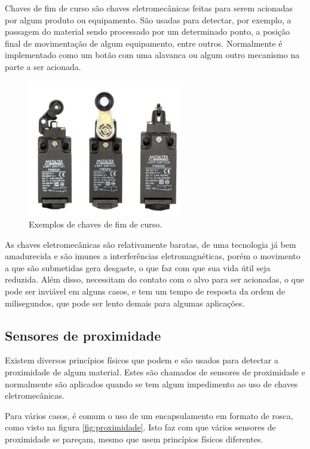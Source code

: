 Chaves de fim de curso são chaves eletromecânicas feitas para serem acionadas por algum produto ou equipamento. São usadas para detectar, por exemplo, a passagem do material sendo processado por um determinado ponto, a posição final de movimentação de algum equipamento, entre outros. Normalmente é implementado como um botão com uma alavanca ou algum outro mecanismo na parte a ser acionada.

\begin{figure}
  \centering
  \includegraphics[width=0.6\textwidth]{figuras/fim-de-curso}
  \caption{Exemplos de chaves de fim de curso.}\label{fig:fim-de-curso}
\end{figure}

As chaves eletromecânicas são relativamente baratas, de uma tecnologia já bem amadurecida e são imunes a interferências eletromagnéticas, porém o movimento a que são submetidas gera desgaste, o que faz com que sua vida útil seja reduzida. Além disso, necessitam do contato com o alvo para ser acionadas, o que pode ser inviável em alguns casos, e tem um tempo de resposta da ordem de milisegundos, que pode ser lento demais para algumas aplicações.

\subsection{Sensores de proximidade}

 Existem diversos princípios físicos que podem e são usados para detectar a proximidade de algum material. Estes são chamados de sensores de proximidade e normalmente são aplicados quando se tem algum impedimento ao uso de chaves eletromecânicas.

Para vários casos, é comum o uso de um encapsulamento em formato de rosca, como visto na figura \ref{fig:proximidade}. Isto faz com que vários sensores de proximidade se pareçam, mesmo que usem princípios físicos diferentes.

